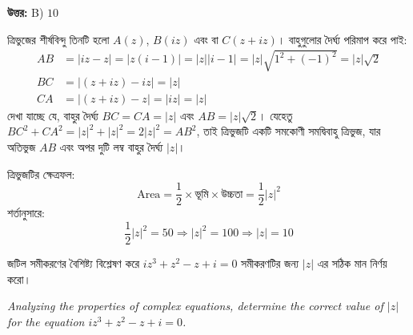 \documentclass[12pt, a4paper]{article}
\begin{document}
\vspace{0.5em}
\begin{tcolorbox}[answerbox]
    \textbf{\color{success} উত্তর:} B) $10$
\end{tcolorbox}
\vspace{1em}

\begin{tcolorbox}[solutionbox={সমাধান (Solution)}]
    \noindent
    ত্রিভুজের শীর্ষবিন্দু তিনটি হলো $A(z)$, $B(iz)$ এবং বা $C(z+iz)$। বাহুগুলোর দৈর্ঘ্য পরিমাপ করে পাই:
    \begin{align*}
        AB &= |iz - z| = |z(i - 1)| = |z||i-1| = |z|\sqrt{1^2+(-1)^2} = |z|\sqrt{2} \\
        BC &= |(z+iz) - iz| = |z| \\
        CA &= |(z+iz) - z| = |iz| = |z|
    \end{align*}
    দেখা যাচ্ছে যে, বাহুর দৈর্ঘ্য $BC = CA = |z|$ এবং $AB = |z|\sqrt{2}$। যেহেতু $BC^2 + CA^2 = |z|^2 + |z|^2 = 2|z|^2 = AB^2$, তাই ত্রিভুজটি একটি সমকোণী সমদ্বিবাহু ত্রিভুজ, যার অতিভুজ $AB$ এবং অপর দুটি লম্ব বাহুর দৈর্ঘ্য $|z|$।
    
    ত্রিভুজটির ক্ষেত্রফল:
    \[ \text{Area} = \frac{1}{2} \times \text{ভূমি} \times \text{উচ্চতা} = \frac{1}{2} |z|^2 \]
    শর্তানুসারে:
    \[ \frac{1}{2} |z|^2 = 50 \Rightarrow |z|^2 = 100 \Rightarrow |z| = 10 \]
\end{tcolorbox}

\vspace{1em}

\begin{tcolorbox}[questionbox={প্রশ্ন (Question) 4}]
    \noindent
    জটিল সমীকরণের বৈশিষ্ট্য বিশ্লেষণ করে $iz^3 + z^2 - z + i = 0$ সমীকরণটির জন্য $|z|$ এর সঠিক মান নির্ণয় করো।
    
    \vspace{0.8em}
    \begin{english}
    \noindent\textit{\color{darkgray}
    Analyzing the properties of complex equations, determine the correct value of $|z|$ for the equation $iz^3 + z^2 - z + i = 0$.
    }
    \end{english}
\end{tcolorbox}
\end{document}
